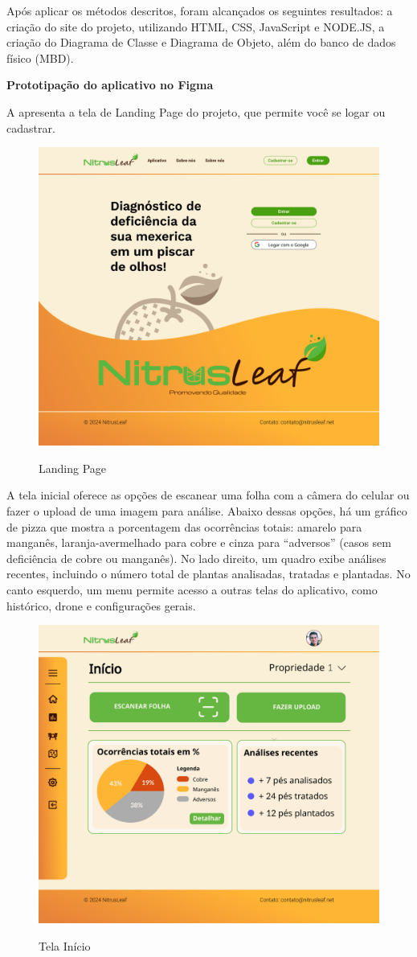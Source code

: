 Após aplicar os métodos descritos, foram alcançados os seguintes resultados: a criação do site do projeto, utilizando HTML, CSS, JavaScript e NODE.JS, a criação do Diagrama de Classe e Diagrama de Objeto, além do banco de dados físico (MBD).

\textbf{Prototipação do aplicativo no Figma}

A  apresenta a tela de Landing Page do projeto, que permite você se logar ou cadastrar.

\begin{figure}[H]
    \centering
    \caption{Landing Page}
    \includegraphics[width=0.7\linewidth]{Illustrations/Landing-Page.png}
    \label{fig:landing-page}
\end{figure}

A tela inicial  oferece as opções de escanear uma folha com a câmera do celular ou fazer o upload de uma imagem para análise. Abaixo dessas opções, há um gráfico de pizza que mostra a porcentagem das ocorrências totais: amarelo para manganês, laranja-avermelhado para cobre e cinza para “adversos” (casos sem deficiência de cobre ou manganês). No lado direito, um quadro exibe análises recentes, incluindo o número total de plantas analisadas, tratadas e plantadas. No canto esquerdo, um menu permite acesso a outras telas do aplicativo, como histórico, drone e configurações gerais.

\begin{figure}[H]
\centering
\caption{Tela Início}
\includegraphics[width=0.7\linewidth]{Illustrations/tela-inicios.png}
\label{fig:tela-inicio}
\end{figure}

